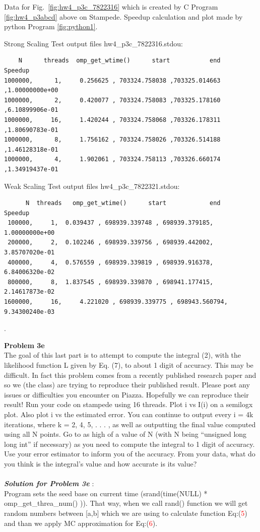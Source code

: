 \documentclass{article}
\begin{document}
Data for Fig.\ \ref{fig:hw4_p3c_7822316}  which is created by C Program \ref{fig:hw4_p3abcd} above on Stampede. Speedup calculation and plot made by python Program \ref{fig:python1}. 

Strong Scaling Test output files hw4\_p3c\_7822316.stdou: 
\begin{lstlisting}
    N      threads  omp_get_wtime()      start           end           Speedup        
1000000,	  1,	 0.256625 ,	703324.758038 ,703325.014663 ,1.00000000e+00
1000000,	  2,	 0.420077 ,	703324.758083 ,703325.178160 ,6.10899906e-01
1000000,	 16,	 1.420244 ,	703324.758068 ,703326.178311 ,1.80690783e-01
1000000,	  8,	 1.756162 ,	703324.758026 ,703326.514188 ,1.46128318e-01
1000000,	  4,	 1.902061 ,	703324.758113 ,703326.660174 ,1.34919437e-01
\end{lstlisting}


Weak Scaling Test output files hw4\_p3c\_7822321.stdou: 
\begin{lstlisting}
      N  threads   omp_get_wtime()      start            end           Speedup        
 100000,	 1,	 0.039437 ,	698939.339748 ,	698939.379185, 1.00000000e+00
 200000,	 2,	 0.102246 ,	698939.339756 ,	698939.442002, 3.85707020e-01
 400000,	 4,	 0.576559 ,	698939.339819 ,	698939.916378, 6.84006320e-02
 800000,	 8,	 1.837545 ,	698939.339870 ,	698941.177415, 2.14617873e-02
1600000,	 16,	 4.221020 ,	698939.339775 ,	698943.560794, 9.34300240e-03
\end{lstlisting}


.
\newpage

{\bf Problem 3e}
\\
The goal of this last part is to attempt to compute the integral (2), with the likelihood function L given by Eq. (7), to about 1 digit of accuracy. This may be difficult. In fact this problem comes from a recently published research paper and so we (the class) are trying to reproduce their published result. Please post any issues or difficulties you encounter on Piazza. Hopefully we can reproduce their result! Run your code on stampede using 16 threads. Plot i vs I(i) on a semilogx plot. Also plot i vs the estimated error. You can continue to output
every i = 4k iterations, where k = 2, 4, 5, . . . , as well as outputting the final value computed using all N points. Go to as high of a value of N (with N being “unsigned long long int” if necessary) as you need to compute the integral to 1 digit of accuracy. Use your error estimator to inform you of the accuracy. From your data, what do you think is the integral’s value and how accurate is its value?
\\
\\
\textbf{\textit{Solution for Problem 3e}} :
\\
Program sets the seed base on current time (srand(time(NULL) * omp\_get\_threa\_num() )). That way, when we call rand() function we will get random numbers between [a,b] which we are using to calculate function Eq:(\textcolor{red}{5}) and than we apply MC approximation for  Eq:(\textcolor{red}{6}).
\end{document}
